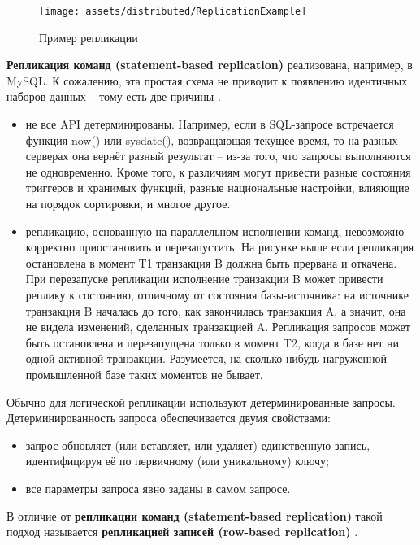 \begin{figure}[H]
    \centering
    \texttt{[image: assets/distributed/ReplicationExample]}
    \caption{Пример репликации}
    \label{fig:ReplicationExample}
\end{figure}

\textbf{Репликация команд (statement-based replication)} реализована, например, в MySQL. К сожалению, эта простая схема не
приводит к появлению идентичных наборов данных – тому есть две причины \autocite{PhysLogPeplic}.
\begin{itemize}
    \item не все API детерминированы. Например, если в SQL-запросе встречается функция now() или sysdate(), возвращающая текущее время, то на разных серверах она вернёт разный результат – из-за того, что запросы выполняются не одновременно. Кроме того, к различиям могут привести разные состояния триггеров и хранимых функций, разные национальные настройки, влияющие на порядок сортировки, и многое другое.
    \item репликацию, основанную на параллельном исполнении команд, невозможно корректно приостановить и перезапустить. На рисунке выше если репликация остановлена в момент T1 транзакция B должна быть прервана и откачена. При перезапуске репликации исполнение транзакции B может привести реплику к состоянию, отличному от состояния базы-источника: на источнике транзакция B началась до того, как закончилась транзакция A, а значит, она не видела изменений, сделанных транзакцией A. Репликация запросов может быть остановлена и перезапущена только в момент T2, когда в базе нет ни одной активной транзакции. Разумеется, на сколько-нибудь нагруженной промышленной базе таких моментов не бывает.
\end{itemize}

Обычно для логической репликации используют детерминированные запросы. Детерминированность запроса обеспечивается двумя
свойствами:
\begin{itemize}
    \item запрос обновляет (или вставляет, или удаляет) единственную запись, идентифицируя её по первичному (или уникальному) ключу;
    \item все параметры запроса явно заданы в самом запросе.
\end{itemize}

В отличие от \textbf{репликации команд (statement-based replication)} такой подход называется \textbf{репликацией
записей (row-based replication)} \autocite{PhysLogPeplic}.


